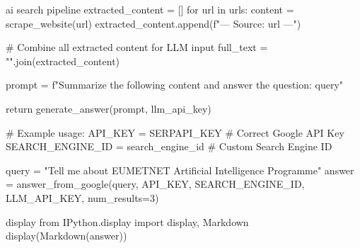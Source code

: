 \begin{codeonly}{ai search pipeline}
    extracted_content = []
    for url in urls:
        content = scrape_website(url)
        extracted_content.append(f"\n--- Source: {url} ---")

    # Combine all extracted content for LLM input
    full_text = "\n\n".join(extracted_content)

    prompt = f"Summarize the following content and answer the question: {query}\n{}"

    return generate_answer(prompt, llm_api_key)

# Example usage:
API_KEY = SERPAPI_KEY  # Correct Google API Key
SEARCH_ENGINE_ID = search_engine_id  # Custom Search Engine ID

query = "Tell me about EUMETNET Artificial Intelligence Programme"
answer = answer_from_google(query, API_KEY, SEARCH_ENGINE_ID, LLM_API_KEY, num_results=3)
\end{codeonly}


\begin{codeonly}{display}
 from IPython.display import display, Markdown
display(Markdown(answer))
\end{codeonly}

